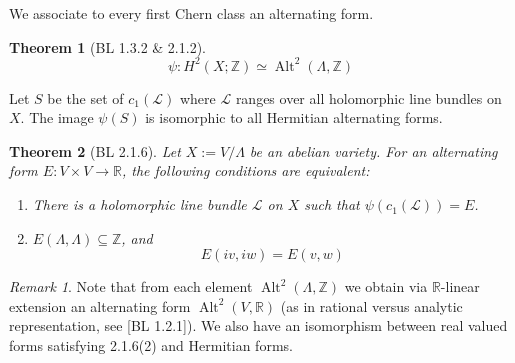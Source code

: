 \documentclass[12pt,reqno]{amsart}
\DeclareMathOperator{\Alt}{Alt}
\newcommand{\Z}{\mathbb{Z}}
\newcommand{\R}{\mathbb{R}}
\newcommand{\mc}{\mathcal}
\newtheorem*{thm*}{Theorem}
\theoremstyle{definition}
\theoremstyle{remark}
\newtheorem*{remark}{Remark}
\newcommand{\ti}{\todo[inline]}
\begin{document}

We associate to every first Chern class an alternating form.

\begin{thm*} [BL 1.3.2 \& 2.1.2] $$\psi: H^2(X; \Z) \simeq \Alt^2(\Lambda, \Z)$$ 
\end{thm*} 




 
 
Let $S$ be the set of $c_1(\mc{L})$ where $\mc{L}$ ranges over all holomorphic line bundles on $X$. The image $\psi(S)$ is isomorphic to all Hermitian alternating forms.




\begin{thm*} [BL 2.1.6] Let $X:= V/\Lambda$ be an abelian variety. For an alternating form $E: V \times V \to \R$, the following conditions are equivalent: 

\begin{enumerate} 
\item There is a holomorphic line bundle $\mc{L}$ on $X$ such that $\psi(c_1(\mc{L}))= E$. 
\item $E(\Lambda, \Lambda) \subseteq \Z$, and $$E(iv, iw) = E(v, w)$$
\end{enumerate}
\end{thm*} 

 
\begin{remark} Note that from each element $\Alt^2(\Lambda, \Z)$ we obtain via $\R$-linear extension an alternating form $\Alt^2(V, \R)$ (as in rational versus analytic representation, see [BL 1.2.1]). We also have an isomorphism between real valued forms satisfying 2.1.6(2) and Hermitian forms. \end{remark}
\end{document}
